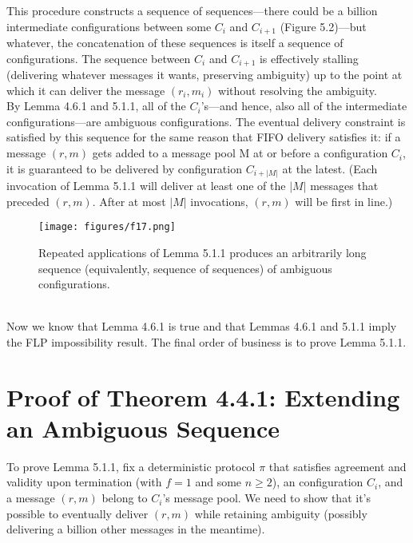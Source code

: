 This procedure constructs a sequence of sequences—there could be a billion intermediate
configurations between some $C_i$ and $C_{i+1}$ (Figure 5.2)—but whatever, the concatenation of
these sequences is itself a sequence of configurations. The sequence between $C_i$ and $C_{i+1}$ is
effectively stalling (delivering whatever messages it wants, preserving ambiguity) up to the
point at which it can deliver the message $(r_i, m_i)$ without resolving the ambiguity.\\
By Lemma 4.6.1 and 5.1.1, all of the $C_i$’s—and hence, also all of the intermediate configurations—are ambiguous configurations. The eventual delivery constraint is satisfied by this sequence for the same reason that FIFO delivery satisfies it: if a message $(r, m)$ gets added to a message pool M at or before a configuration $C_i$, it is guaranteed to be delivered by configuration $C_{i+|M|}$ at the latest. (Each invocation of Lemma 5.1.1 will
deliver at least one of the $|M|$ messages that preceded $(r, m)$. After at most $|M|$ invocations,
$(r, m)$ will be first in line.)\\
\begin{figure}[h]
    \centering
    \texttt{[image: figures/f17.png]}
    \caption{Repeated applications of Lemma 5.1.1 produces an arbitrarily long sequence (equivalently, sequence of sequences) of ambiguous configurations.}
    \label{fig:mesh1}
\end{figure}\\
Now we know that Lemma 4.6.1 is true and that Lemmas 4.6.1 and 5.1.1 imply the FLP impossibility result. The final order of business is to prove Lemma 5.1.1.
\newpage
\section{Proof of Theorem 4.4.1: Extending an Ambiguous Sequence}
To prove Lemma 5.1.1, fix a deterministic protocol $\pi$ that satisfies agreement and validity
upon termination (with $f = 1$ and some $n \geq 2$), an configuration $C_i$, and a message $(r, m)$
belong to $C_i$’s message pool. We need to show that it’s possible to eventually deliver $(r, m)$
while retaining ambiguity (possibly delivering a billion other messages in the meantime).


